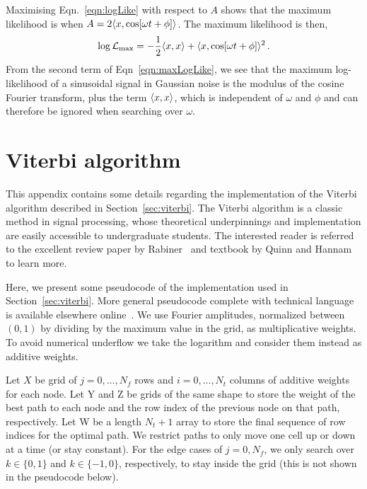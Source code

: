\documentclass[paper-main.tex]{subfiles}
\begin{document}
Maximising Eqn.~\ref{eqn:logLike} with respect to $A$ shows that the maximum likelihood is when $A = 2\langle x,\cos[\omega t + \phi] \rangle$. 
The maximum likelihood is then, 
\begin{eqnarray}
\label{eqn:maxLogLike}
\log \mathcal{L}_\mathrm{max} = - \frac{1}{2} \langle x,x \rangle + \langle x,\cos[\omega t + \phi] \rangle^2\,. 
\end{eqnarray}
From the second term of Eqn~\ref{eqn:maxLogLike}, we see that the maximum log-likelihood of a sinusoidal signal in Gaussian noise is the modulus of the cosine Fourier transform, plus the term $\langle x,x \rangle$, which is independent of $\omega$ and $\phi$ and can therefore be ignored when searching over $\omega$.




\section{Viterbi algorithm}
\label{app:viterbi}

This appendix contains some details regarding the implementation of the Viterbi algorithm described in Section~\ref{sec:viterbi}. 
The Viterbi algorithm is a classic method in signal processing, whose theoretical underpinnings and implementation are easily accessible to undergraduate students. 
The interested reader is referred to the excellent review paper by Rabiner~\cite{Rabiner:1989} and textbook by Quinn and Hannam~\cite{QuinnEtAl:2001} to learn more. 

Here, we present some pseudocode of the implementation used in Section~\ref{sec:viterbi}. More general pseudocode complete with technical language is available elsewhere online~\cite{viterbipseudocode:online}. We use Fourier amplitudes, normalized between $(0, 1)$ by dividing by the maximum value in the grid, as multiplicative weights. To avoid numerical underflow we take the logarithm and consider them instead as additive weights.

Let $X$ be grid of $j=0,\ldots,N_f$ rows and $i=0,\ldots,N_t$ columns of additive weights for each node. Let Y and Z be grids of the same shape to store the weight of the best path to each node and the row index of the previous node on that path, respectively. Let W be a length $N_t+1$ array to store the final sequence of row indices for the optimal path. We restrict paths to only move one cell up or down at a time (or stay constant). For the edge cases of $j=0,N_f$, we only search over $k \in \{0,1\}$ and $k \in \{-1,0\}$, respectively, to stay inside the grid (this is not shown in the pseudocode below).
\end{document}
